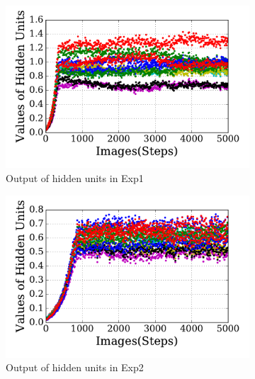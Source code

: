 \begin{figure}
\DIFdelendFL \DIFaddbeginFL \begin{subfigure}[t]{0.48\textwidth}
		\DIFaddendFL \includegraphics[width=\textwidth]{pics_sdlm/31_exp_RBM_noise/exp1_hid_s.pdf}
		\caption{Output of hidden units in Exp1}
	\end{subfigure}
	\DIFdelbeginFL %
\DIFdelendFL \DIFaddbeginFL \begin{subfigure}[t]{0.48\textwidth}
		\DIFaddendFL \includegraphics[width=\textwidth]{pics_sdlm/31_exp_RBM_noise/exp2_hid_s.pdf}
		\caption{Output of hidden units in Exp2}
	\end{subfigure}\\
	\DIFdelbeginFL %
\DIFdelendFL \DIFaddbeginFL \begin{subfigure}[t]{0.48\textwidth}

\end{subfigure}
\end{figure}

